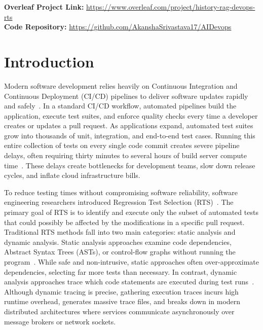 \documentclass[12pt,onecolumn,draftclsnofoot]{IEEEtran}
\begin{document}
\vspace{0.5cm}
\noindent\textbf{Overleaf Project Link:} \url{https://www.overleaf.com/project/history-rag-devops-rts}\\
\noindent\textbf{Code Repository:} \url{https://github.com/AkanshaSrivastava17/AIDevops}

\section{Introduction}
\label{sec:intro}
Modern software development relies heavily on Continuous Integration and Continuous Deployment (CI/CD) pipelines to deliver software updates rapidly and safely~\cite{rothermel1997safe, yoo2012regression}. In a standard CI/CD workflow, automated pipelines build the application, execute test suites, and enforce quality checks every time a developer creates or updates a pull request. As applications expand, automated test suites grow into thousands of unit, integration, and end-to-end test cases. Running this entire collection of tests on every single code commit creates severe pipeline delays, often requiring thirty minutes to several hours of build server compute time~\cite{chen2019test}. These delays create bottlenecks for development teams, slow down release cycles, and inflate cloud infrastructure bills.

To reduce testing times without compromising software reliability, software engineering researchers introduced Regression Test Selection (RTS)~\cite{rothermel1997safe, engstrom2010systematic}. The primary goal of RTS is to identify and execute only the subset of automated tests that could possibly be affected by the modifications in a specific pull request. Traditional RTS methods fall into two main categories: static analysis and dynamic analysis. Static analysis approaches examine code dependencies, Abstract Syntax Trees (ASTs), or control-flow graphs without running the program~\cite{rothermel1997safe}. While safe and non-intrusive, static approaches often over-approximate dependencies, selecting far more tests than necessary. In contrast, dynamic analysis approaches trace which code statements are executed during test runs~\cite{chen2019test}. Although dynamic tracing is precise, gathering execution traces incurs high runtime overhead, generates massive trace files, and breaks down in modern distributed architectures where services communicate asynchronously over message brokers or network sockets.
\end{document}
